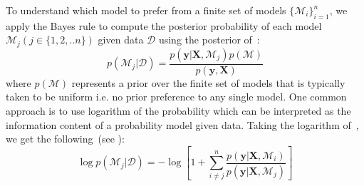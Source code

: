 To understand which model to prefer from a finite set of models  \(\bigl\{\mathcal{M}_i\bigr\}_{i=1}^n\), we apply the Bayes rule to compute the posterior probability of each model \(\mathcal{M}_{j}(j\in\{1,2,..n\})\) given data \(\mathcal{D}\) using the posterior of~: 
\begin{equation}
    p(\mathcal{M}_j\vert \mathcal{D}) = \frac{p(\textbf{y}\vert \textbf{X},\mathcal{M}_j)p(\mathcal{M})}{p(\textbf{y},\textbf{X})}
    \label{eq:postM}
\end{equation}
where \(p(\mathcal{M})\) represents a prior over the finite set of models that is typically taken to be uniform i.e. no prior preference to any single model. 
One common approach is to use logarithm of the probability which can be interpreted as the information content of a probability model given data. 
Taking the logarithm of~, we get the following~(see ): 
\begin{equation}
    \log p(\mathcal{M}_j\vert \mathcal{D}) = -\log \left [ 1+\sum_{i\neq j}^{n} \frac{p(\textbf{y}\vert \textbf{X},\mathcal{M}_i)}{p(\textbf{y}\vert \textbf{X},\mathcal{M}_j)}\right]
\label{eq:logPostM}
\end{equation}




